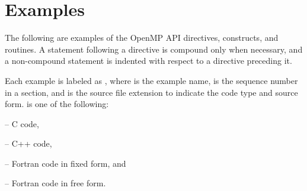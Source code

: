 
\chapter*{Examples}
\label{chap:examples}
The following are examples of the OpenMP API directives, constructs, and routines.
\ccppspecificstart
A statement following a directive is compound only when necessary, and a 
non-compound statement is indented with respect to a directive preceding it.
\ccppspecificend

Each example is labeled as , where  is 
the example name,  is the sequence number in a section, and 
 is the source file extension to indicate the code type and 
source form.   is one of the following:
\begin{compactitem}
\item {} -- C code,
\item {} -- C++ code,
\item {} -- Fortran code in fixed form, and
\item {} -- Fortran code in free form.
\end{compactitem}

